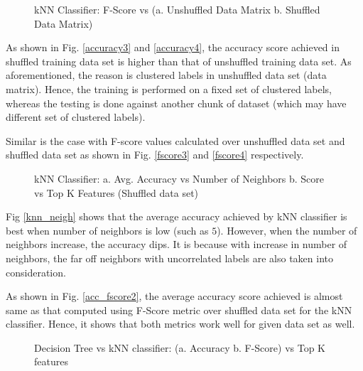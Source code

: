 \documentclass[journal,onecolumn]{IEEEtran}
\begin{document}
\begin{figure}[h]
\begin{center}
\label{thr}
\caption{ kNN Classifier: F-Score vs (a. Unshuffled Data Matrix  b. Shuffled Data Matrix) }
\end{center}
\end{figure}


As shown in Fig. \ref{accuracy3} and \ref{accuracy4}, the accuracy score achieved in shuffled training data set is higher than that of unshuffled training data set. As aforementioned, the reason is clustered labels in unshuffled data set (data matrix). Hence, the training is performed on a fixed set of clustered labels, whereas the testing is done against another chunk of dataset (which may have different set of clustered labels). 

Similar is the case with F-score values calculated over unshuffled data set and shuffled data set as shown in Fig. \ref{fscore3} and \ref{fscore4} respectively.


\begin{figure}[h]
\begin{center}
 \caption {kNN Classifier: a. Avg. Accuracy vs Number of Neighbors  b. Score vs Top K Features (Shuffled data set)}
 \end{center}
\end{figure}

Fig \ref{knn_neigh} shows that the average accuracy achieved by kNN classifier is best when number of neighbors is low (such as $5$). However, when the number of neighbors increase, the accuracy dips. It is because with increase in number of neighbors, the far off neighbors with uncorrelated labels are also taken into consideration.

As shown in Fig. \ref{acc_fscore2}, the average accuracy score achieved is almost same as that computed using F-Score metric over shuffled data set for the kNN classifier. Hence, it shows that both metrics work well for given data set as well.

\begin{figure}[h]
\begin{center}
\label{thr}
\caption{ Decision Tree vs kNN classifier: (a. Accuracy b. F-Score) vs Top K features }
\end{center}
\end{figure}
\end{document}

